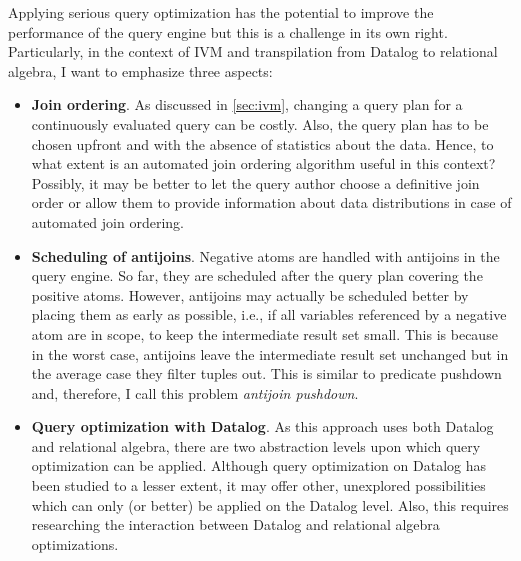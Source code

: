 
Applying serious query optimization has the potential to improve
the performance of the query engine but this is a challenge in its own right.
Particularly, in the context of \ac{IVM} and transpilation from Datalog to
relational algebra, I want to emphasize three aspects:

\begin{itemize}
	\item \textbf{Join ordering}.
	      As discussed in \ref{sec:ivm}, changing a query plan for a continuously
	      evaluated query can be costly.
	      Also, the query plan has to be chosen upfront and with the absence of
	      statistics about the data.
	      Hence, to what extent is an automated join ordering algorithm useful
	      in this context? Possibly, it may be better to let the query
	      author choose a definitive join order or allow them to provide
	      information about data distributions in case of automated join ordering.
	\item \textbf{Scheduling of antijoins}.
	      Negative atoms are handled with antijoins in the query engine.
	      So far, they are scheduled after the query plan covering the
	      positive atoms.
	      However, antijoins may actually be scheduled better by placing them
	      as early as possible, i.e., if all variables referenced by a
	      negative atom are in scope, to keep the intermediate result set small.
	      This is  because in the worst case, antijoins leave the intermediate
	      result set unchanged but in the average case they filter tuples out.
	      This is similar to predicate pushdown and, therefore, I call this
	      problem \emph{antijoin pushdown}.
	\item \textbf{Query optimization with Datalog}.
	      As this approach uses both Datalog and relational algebra,
		  there are two abstraction levels upon which query optimization
		  can be applied.
		  Although query optimization on Datalog has been studied
		  to a lesser extent, it may offer other, unexplored possibilities
		  which can only (or better) be applied on the Datalog level.
		  Also, this requires researching the interaction between
		  Datalog and relational algebra optimizations.
\end{itemize}

